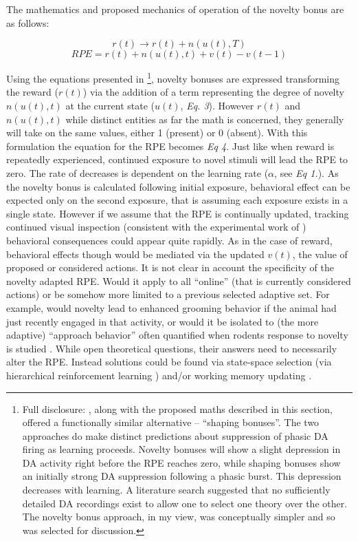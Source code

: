 \documentclass[doc]{apa}        %
\begin{document}
The mathematics and proposed mechanics of operation of the novelty bonus are as follows: 

\begin{equation} r(t) \rightarrow r(t) + n(u(t),T) 	\end{equation}		\begin{equation} RPE = r(t)+ n(u(t),t) + v(t) - v(t-1) 	\end{equation}

Using the equations presented in \footnote{Full disclosure: , along with the proposed maths described in this section, offered a functionally similar alternative -- ``shaping bonuses''.  The two approaches do make distinct predictions about suppression of phasic DA firing as learning proceeds.  Novelty bonuses will show a slight depression in DA activity right before the RPE reaches zero, while shaping bonuses show an initially strong DA suppression following a phasic burst.  This depression decreases with learning. A literature search suggested that no sufficiently detailed DA recordings exist to allow one to select one theory over the other.   The novelty bonus approach, in my view, was conceptually simpler and so was selected for discussion.}, novelty bonuses are expressed transforming the reward ($r(t)$) via the addition of a term representing the degree of novelty $n(u(t),t)$ at the current state ($u(t)$, \emph{Eq. 3}).  However $r(t)$ and $n(u(t),t)$ while distinct entities as far the math is concerned, they generally will take on the same values, either 1 (present) or 0 (absent).  With this formulation the equation for the RPE becomes \emph{Eq 4}.  Just like when reward is repeatedly experienced, continued exposure to novel stimuli will lead the RPE to zero.  The rate of decreases is dependent on the learning rate ($\alpha$, see \emph{Eq 1.}).  As the novelty bonus is calculated following initial exposure, behavioral effect can be expected only on the second exposure, that is assuming each exposure exists in a single state.  However if we assume that the RPE is continually updated, tracking continued visual inspection (consistent with the experimental work of ) behavioral consequences could appear quite rapidly.  As in the case of reward, behavioral effects though would be mediated via the updated $v(t)$, the value of proposed or considered actions.  It is not clear in  account the specificity of  the novelty adapted RPE.  Would it apply to all ``online'' (that is currently considered actions) or be somehow more limited to a previous selected adaptive set.  For example, would novelty lead to enhanced grooming behavior if the animal had just recently engaged in that activity, or would it be isolated to (the more adaptive) ``approach behavior'' often quantified when rodents response to novelty is studied \cite{Hazy:2010p7217}.  While open theoretical questions, their answers need to necessarily alter the RPE.  Instead solutions could be found via state-space selection (via hierarchical reinforcement learning \cite{Botvinick:2008p6594}) and/or working memory updating \cite{OReilly:2006p2615}. 
\end{document}
